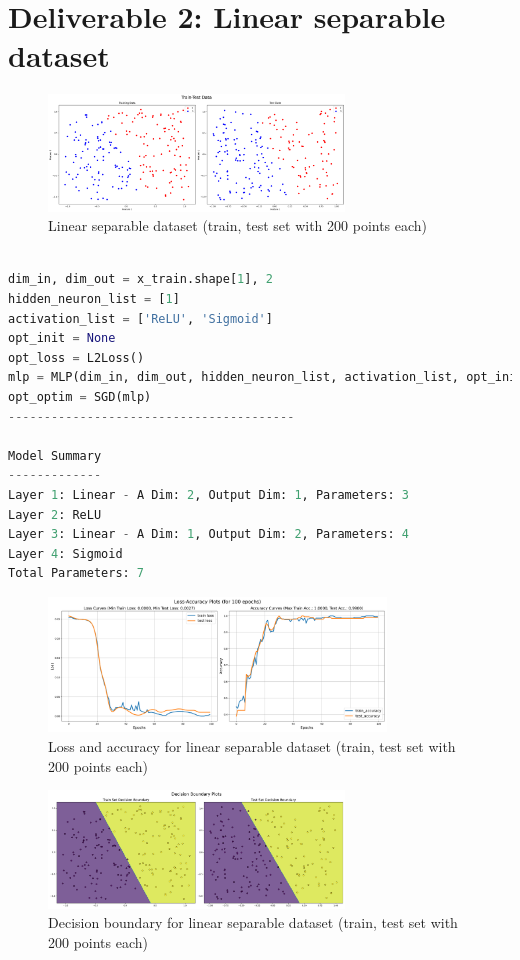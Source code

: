 
\section{Deliverable 2: Linear separable dataset}


\begin{solve}    

\begin{figure}[H]
    \centering
    \includegraphics[width=0.7\textwidth]{plots/2_lineardataset.png}
    \caption{Linear separable dataset (train, test set with 200 points each)}
\end{figure}

\begin{lstlisting}[language=python]

dim_in, dim_out = x_train.shape[1], 2
hidden_neuron_list = [1]
activation_list = ['ReLU', 'Sigmoid']
opt_init = None
opt_loss = L2Loss()
mlp = MLP(dim_in, dim_out, hidden_neuron_list, activation_list, opt_init)
opt_optim = SGD(mlp)
----------------------------------------

Model Summary
-------------
Layer 1: Linear - A Dim: 2, Output Dim: 1, Parameters: 3
Layer 2: ReLU
Layer 3: Linear - A Dim: 1, Output Dim: 2, Parameters: 4
Layer 4: Sigmoid
Total Parameters: 7
\end{lstlisting}

\begin{figure}[H]
    \centering
    \includegraphics[width=0.8\textwidth]{plots/2_linearloss_acc.png}
    \caption{Loss and accuracy for linear separable dataset (train, test set with 200 points each)}
\end{figure}

\begin{figure}[H]
    \centering
    \includegraphics[width=0.7\textwidth]{plots/2_linearboundary.png}
    \caption{Decision boundary for linear separable dataset (train, test set with 200 points each)}
\end{figure}

\end{solve}
